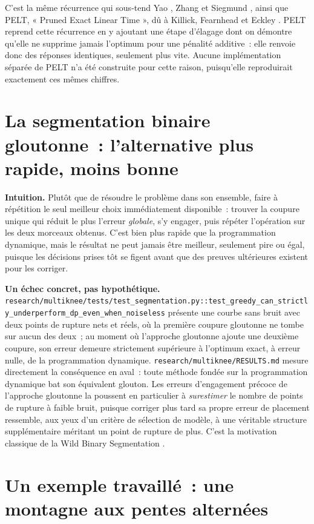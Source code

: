 \documentclass[11pt]{article}
\newcommand{\code}[1]{\texttt{#1}}
\begin{document}
C'est la même récurrence qui sous-tend Yao \citeyearpar{yao1988}, Zhang et
Siegmund \citeyearpar{zhangsiegmund2007}, ainsi que PELT, « Pruned Exact
Linear Time », dû à Killick, Fearnhead et Eckley
\citeyearpar{killick2012}. PELT reprend cette récurrence en y ajoutant une
étape d'élagage dont on démontre qu'elle ne supprime jamais l'optimum pour
une pénalité additive~: elle renvoie donc des réponses identiques,
seulement plus vite. Aucune implémentation séparée de PELT n'a été
construite pour cette raison, puisqu'elle reproduirait exactement ces mêmes
chiffres.

\section{La segmentation binaire gloutonne~: l'alternative plus rapide, moins bonne}

\textbf{Intuition.} Plutôt que de résoudre le problème dans son ensemble,
faire à répétition le seul meilleur choix immédiatement disponible~:
trouver la coupure unique qui réduit le plus l'erreur \emph{globale}, s'y
engager, puis répéter l'opération sur les deux morceaux obtenus. C'est bien
plus rapide que la programmation dynamique, mais le résultat ne peut jamais
être meilleur, seulement pire ou égal, puisque les décisions prises tôt se
figent avant que des preuves ultérieures existent pour les corriger.

\textbf{Un échec concret, pas hypothétique.}
\code{research/multiknee/tests/test\_segmentation.py::test\_greedy\_can\_strictly\_underperform\_dp\_even\_when\_noiseless}
présente une courbe sans bruit avec deux points de rupture nets et réels,
où la première coupure gloutonne ne tombe sur aucun des deux~; au moment où
l'approche gloutonne ajoute une deuxième coupure, son erreur demeure
strictement supérieure à l'optimum exact, à erreur nulle, de la
programmation dynamique. \code{research/multiknee/RESULTS.md} mesure
directement la conséquence en aval~: toute méthode fondée sur la
programmation dynamique bat son équivalent glouton. Les erreurs
d'engagement précoce de l'approche gloutonne la poussent en particulier à
\emph{surestimer} le nombre de points de rupture à faible bruit, puisque
corriger plus tard sa propre erreur de placement ressemble, aux yeux d'un
critère de sélection de modèle, à une véritable structure supplémentaire
méritant un point de rupture de plus. C'est la motivation classique de la
Wild Binary Segmentation \citep{fryzlewicz2014}.

\section{Un exemple travaillé~: une montagne aux pentes alternées}
\end{document}
